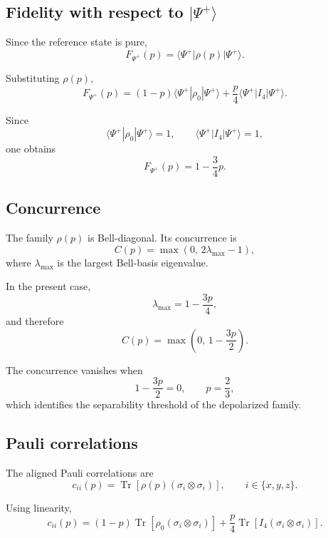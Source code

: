 \documentclass[a4paper]{article}
\begin{document}

\subsection*{Fidelity with respect to \texorpdfstring{$|\Psi^+\rangle$}{|Psi+>}}

Since the reference state is pure,
\[
F_{\Psi^+}(p)
=
\langle\Psi^+|\rho(p)|\Psi^+\rangle.
\]

Substituting \( \rho(p) \),
\[
F_{\Psi^+}(p)
=
(1-p)\langle\Psi^+|\rho_0|\Psi^+\rangle
+
\frac{p}{4}\langle\Psi^+|I_4|\Psi^+\rangle.
\]

Since
\[
\langle\Psi^+|\rho_0|\Psi^+\rangle = 1,
\qquad
\langle\Psi^+|I_4|\Psi^+\rangle = 1,
\]
one obtains
\[
F_{\Psi^+}(p)
=
1-\frac{3}{4}p.
\]


\subsection*{Concurrence}

The family \( \rho(p) \) is Bell-diagonal. Its concurrence is
\[
C(p)
=
\max\left(0,\,2\lambda_{\max}-1\right),
\]
where \( \lambda_{\max} \) is the largest Bell-basis eigenvalue.

In the present case,
\[
\lambda_{\max}
=
1-\frac{3p}{4},
\]
and therefore
\[
C(p)
=
\max\left(0,\,1-\frac{3p}{2}\right).
\]

The concurrence vanishes when
\[
1-\frac{3p}{2}=0,
\qquad
p=\frac{2}{3},
\]
which identifies the separability threshold of the depolarized family.


\subsection*{Pauli correlations}

The aligned Pauli correlations are
\[
c_{ii}(p)
=
\operatorname{Tr}\!\left[\rho(p)(\sigma_i\otimes\sigma_i)\right],
\qquad
i\in\{x,y,z\}.
\]

Using linearity,
\[
c_{ii}(p)
=
(1-p)\operatorname{Tr}\!\left[\rho_0(\sigma_i\otimes\sigma_i)\right]
+
\frac{p}{4}\operatorname{Tr}\!\left[I_4(\sigma_i\otimes\sigma_i)\right].
\]
\end{document}

